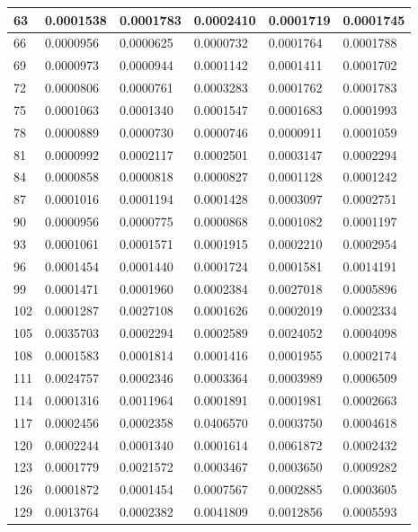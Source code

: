 \documentclass{article}
\begin{document}
\begin{table}[H]
\begin{tabular}{|l|l|l|l|l|l|}
63 & 0.0001538 & 0.0001783 & 0.0002410 & 0.0001719 & 0.0001745 \\ \hline
66 & 0.0000956 & 0.0000625 & 0.0000732 & 0.0001764 & 0.0001788 \\ \hline
69 & 0.0000973 & 0.0000944 & 0.0001142 & 0.0001411 & 0.0001702 \\ \hline
72 & 0.0000806 & 0.0000761 & 0.0003283 & 0.0001762 & 0.0001783 \\ \hline
75 & 0.0001063 & 0.0001340 & 0.0001547 & 0.0001683 & 0.0001993 \\ \hline
78 & 0.0000889 & 0.0000730 & 0.0000746 & 0.0000911 & 0.0001059 \\ \hline
81 & 0.0000992 & 0.0002117 & 0.0002501 & 0.0003147 & 0.0002294 \\ \hline
84 & 0.0000858 & 0.0000818 & 0.0000827 & 0.0001128 & 0.0001242 \\ \hline
87 & 0.0001016 & 0.0001194 & 0.0001428 & 0.0003097 & 0.0002751 \\ \hline
90 & 0.0000956 & 0.0000775 & 0.0000868 & 0.0001082 & 0.0001197 \\ \hline
93 & 0.0001061 & 0.0001571 & 0.0001915 & 0.0002210 & 0.0002954 \\ \hline
96 & 0.0001454 & 0.0001440 & 0.0001724 & 0.0001581 & 0.0014191 \\ \hline
99 & 0.0001471 & 0.0001960 & 0.0002384 & 0.0027018 & 0.0005896 \\ \hline
102 & 0.0001287 & 0.0027108 & 0.0001626 & 0.0002019 & 0.0002334 \\ \hline
105 & 0.0035703 & 0.0002294 & 0.0002589 & 0.0024052 & 0.0004098 \\ \hline
108 & 0.0001583 & 0.0001814 & 0.0001416 & 0.0001955 & 0.0002174 \\ \hline
111 & 0.0024757 & 0.0002346 & 0.0003364 & 0.0003989 & 0.0006509 \\ \hline
114 & 0.0001316 & 0.0011964 & 0.0001891 & 0.0001981 & 0.0002663 \\ \hline
117 & 0.0002456 & 0.0002358 & 0.0406570 & 0.0003750 & 0.0004618 \\ \hline
120 & 0.0002244 & 0.0001340 & 0.0001614 & 0.0061872 & 0.0002432 \\ \hline
123 & 0.0001779 & 0.0021572 & 0.0003467 & 0.0003650 & 0.0009282 \\ \hline
126 & 0.0001872 & 0.0001454 & 0.0007567 & 0.0002885 & 0.0003605 \\ \hline
129 & 0.0013764 & 0.0002382 & 0.0041809 & 0.0012856 & 0.0005593 \\ \hline

\end{tabular}
\end{table}
\end{document}

